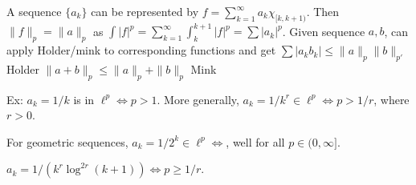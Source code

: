 A sequence $\{a_k\}$ can be represented by $f= \sum_{k=1}^\infty a_k \chi_{[k,k+1)}$. Then $\|f\|_p= \|a\|_p$ as $\int |f|^p= \sum_{k=1}^\infty \int_k^{k+1} |f|^p = \sum |a_k|^p$. Given sequence $a,b$, can apply Holder/mink to corresponding functions and get 
$\sum |a_kb_k| \leq \|a\|_p \|b\|_{p'}$ Holder
$\|a+b\|_p \leq \|a\|_p + \|b\|_p$ Mink

Ex: $a_k=1/k$ is in $\ell^p \iff p>1$. More generally, $a_k= 1/k^r \in \ell^p \iff p>1/r$, where $r>0$.

For geometric sequences, $a_k= 1/2^k \in \ell^p \iff $, well for all $p \in (0,\infty]$. 

$a_k= 1/(k^r \log^{2r}(k+1)) \iff p \geq 1/r$. 









